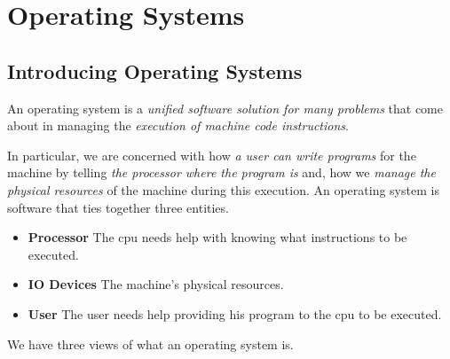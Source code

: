 
\chapter{Operating Systems}


\section{Introducing Operating Systems}

An operating system is a \textit{unified software solution for many problems} 
that come about in managing the \textit{execution of machine code instructions}.

In particular, we are concerned with how \textit{a user can write programs} for the machine 
by telling \textit{the processor where the program is} and, how we \textit{manage the
physical resources} of the machine during this execution.  
An operating system is software that ties together three entities. 

\begin{itemize}   
\renewcommand{\labelitemi}{$\Box$}
\item \textbf{Processor} 
The cpu needs help with knowing what instructions to be executed.
\item \textbf{IO Devices} 
The machine's physical resources.
\item \textbf{User} 
The user needs help providing his program to the cpu to be executed.
\end{itemize}

We have three views of what an operating system is.

